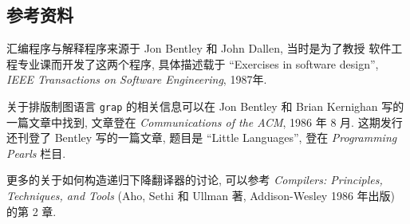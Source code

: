 \subsection*{参考资料}
汇编程序与解释程序来源于 Jon Bentley 和 John Dallen, 当时是为了教授
软件工程专业课而开发了这两个程序, 具体描述载于 ``Exercises in software
design'', \textit{IEEE Transactions on Software Engineering}, 1987年.

关于排版制图语言 \texttt{grap} 的相关信息可以在 Jon Bentley 和 Brian
Kernighan 写的一篇文章中找到, 文章登在 \textit{Communications of the
ACM}, 1986 年 8 月. 这期发行还刊登了 Bentley 写的一篇文章, 题目是
``Little Languages'', 登在 \textit{Programming Pearls} 栏目.

更多的关于如何构造递归下降翻译器的讨论, 可以参考 \textit{Compilers:
Principles, Techniques, and Tools} (Aho, Sethi 和 Ullman 著,
Addison-Wesley 1986 年出版) 的第 2 章.
